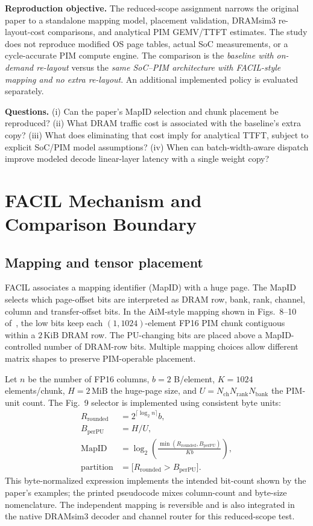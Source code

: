 \documentclass[conference,10pt]{IEEEtran}
\newcommand{\facil}{FACIL}
\newcommand{\MiB}{\,\mathrm{MiB}}
\newcommand{\KiB}{\,\mathrm{KiB}}
\begin{document}
\textbf{Reproduction objective.} The reduced-scope assignment narrows the original
paper to a standalone mapping model, placement validation, DRAMsim3
re-layout-cost comparisons, and analytical PIM GEMV/TTFT estimates.
The study does not reproduce modified OS page tables, actual SoC measurements,
or a cycle-accurate PIM compute engine. The comparison is the
\emph{baseline with on-demand re-layout} versus the \emph{same
SoC--PIM architecture with \facil{}-style mapping and no extra
re-layout}. An additional implemented policy is evaluated separately.

\textbf{Questions.} (i) Can the paper's MapID selection and chunk
placement be reproduced? (ii) What DRAM traffic cost is associated
with the baseline's extra copy? (iii) What does eliminating that
cost imply for analytical TTFT, subject to explicit SoC/PIM model
assumptions? (iv) When can batch-width-aware dispatch improve
modeled decode linear-layer latency with a single weight copy?

\section{FACIL Mechanism and Comparison Boundary}
\subsection{Mapping and tensor placement}
\facil{} associates a mapping identifier (MapID) with a huge page.
The MapID selects which page-offset bits are interpreted as DRAM
row, bank, rank, channel, column and transfer-offset bits. In the
AiM-style mapping shown in Figs.~8--10 of~\cite{facil}, the low bits
keep each $(1,1024)$-element FP16 PIM chunk contiguous within a
\(2\KiB\) DRAM row. The PU-changing bits are placed above a
MapID-controlled number of DRAM-row bits. Multiple mapping choices
allow different matrix shapes to preserve PIM-operable placement.

Let \(n\) be the number of FP16 columns, \(b=2\) B/element,
\(K=1024\) elements/chunk, \(H=2\MiB\) the huge-page size, and
\(U=N_{\mathrm{ch}}N_{\mathrm{rank}}N_{\mathrm{bank}}\) the PIM-unit
count. The Fig.~9 selector is implemented using consistent byte units:
\begin{align}
R_{\mathrm{rounded}}&=2^{\lceil\log_2 n\rceil}b,\\
B_{\mathrm{perPU}}&=H/U,\\
\mathrm{MapID}&=\log_2\!\left(\frac{\min(R_{\mathrm{rounded}},B_{\mathrm{perPU}})}{Kb}\right),\label{eq:mapid}\\
\mathrm{partition}&=\bigl[R_{\mathrm{rounded}}>B_{\mathrm{perPU}}\bigr].\nonumber
\end{align}
This byte-normalized expression implements the intended bit-count
shown by the paper's examples; the printed pseudocode mixes
column-count and byte-size nomenclature. The independent mapping is reversible and is also integrated in the
native DRAMsim3 decoder and channel router for this reduced-scope test.
\end{document}
